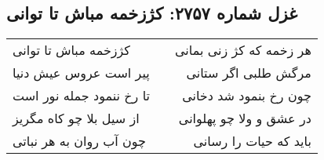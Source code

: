 \begin{center}
\section*{غزل شماره ۲۷۵۷: کژزخمه مباش تا توانی}
\label{sec:2757}
\begin{longtable}{l p{0.5cm} r}
کژزخمه مباش تا توانی
&&
هر زخمه که کژ زنی بمانی
\\
پیر است عروس عیش دنیا
&&
مرگش طلبی اگر ستانی
\\
تا رخ ننمود جمله نور است
&&
چون رخ بنمود شد دخانی
\\
از سیل بلا چو کاه مگریز
&&
در عشق و ولا چو پهلوانی
\\
چون آب روان به هر نباتی
&&
باید که حیات را رسانی
\\
\end{longtable}
\end{center}

